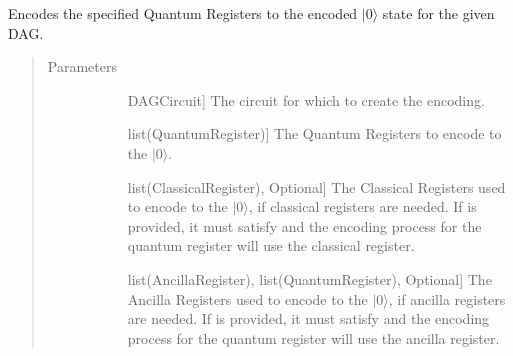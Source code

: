 \documentclass[letterpaper,10pt,english]{sphinxmanual}
\begin{document}
\begin{fulllineitems}

\begin{fulllineitems}
\label{\detokenize{Steane:Steane.SteaneEncoder.getEncoderDag}}
Encodes the specified Quantum Registers to the encoded \(|0\rangle\) state for the given DAG.
\begin{quote}\begin{description}
\item[{Parameters}] \leavevmode\begin{description}
\item[{}] \leavevmode{[}DAGCircuit{]}
The circuit for which to create the encoding.

\item[{}] \leavevmode{[}list(QuantumRegister){]}
The Quantum Registers to encode to the \(|0\rangle\).

\item[{}] \leavevmode{[}list(ClassicalRegister), Optional{]}
The Classical Registers used to encode to the \(|0\rangle\), if classical registers are needed. If  is provided, it must satisfy  and the encoding process for the  quantum register will use the  classical register.

\item[{}] \leavevmode{[}list(AncillaRegister), list(QuantumRegister), Optional{]}
The Ancilla Registers used to encode to the \(|0\rangle\), if ancilla registers are needed. If  is provided, it must satisfy  and the encoding process for the  quantum register will use the  ancilla register.

\end{description}

\end{description}\end{quote}

\end{fulllineitems}


\end{fulllineitems}
\end{document}
